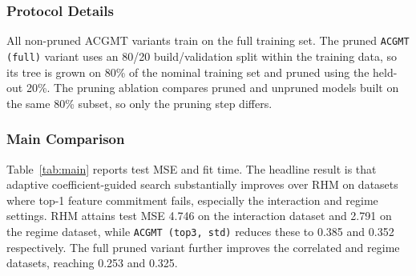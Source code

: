 \documentclass[11pt,a4paper]{article}
\begin{document}
\subsubsection{Protocol Details}

All non-pruned ACGMT variants train on the full training set. The pruned \texttt{ACGMT (full)} variant uses an 80/20 build/validation split within the training data, so its tree is grown on 80\% of the nominal training set and pruned using the held-out 20\%. The pruning ablation compares pruned and unpruned models built on the same 80\% subset, so only the pruning step differs.

\subsubsection{Main Comparison}

Table~\ref{tab:main} reports test MSE and fit time. The headline result is that adaptive coefficient-guided search substantially improves over RHM on datasets where top-1 feature commitment fails, especially the interaction and regime settings. RHM attains test MSE 4.746 on the interaction dataset and 2.791 on the regime dataset, while \texttt{ACGMT (top3, std)} reduces these to 0.385 and 0.352 respectively. The full pruned variant further improves the correlated and regime datasets, reaching 0.253 and 0.325.
\end{document}
